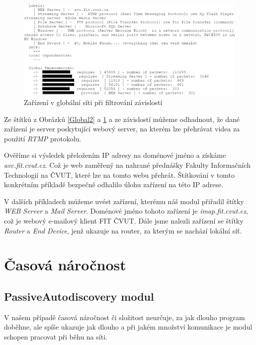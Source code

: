 \documentclass[thesis=B,czech,hidelinks]{FITthesis}[2019/03/21]
\begin{document}
    \newpage
    \begin{figure}[h!]
        \centering
        \includegraphics[width=\textwidth]{Global_filter.png}
        \caption[Ukázka měření: Globální síť s filtrováním závislostí]{Zařízení v globální síti při filtrování závislostí}
        \label{Global3}
    \end{figure}
    
    Ze štítků z Obrázků \ref{Global2} a \ref{Global3}  a ze závislostí můžeme odhadnout, že dané zařízení je server poskytující webový server, na kterém lze přehrávat videa za použití \emph{RTMP} protokolu.
    
    Ověříme si výsledek přeložením IP adresy na doménové jméno a získáme \emph{avc.fit.cvut.cz}. Což je web zaměřený na nahrané přednášky Fakulty Informačních Technologií na ČVUT, které lze na tomto webu přehrát. Štítkování v tomto konkrétním příkladě bezpečně odhalilo úlohu zařízení na této IP adrese. 
    
    V dalších příkladech můžeme uvést zařízení, kterému náš modul přiřadil štítky \emph{WEB Server} a \emph{Mail Server}. Doménové jméno tohoto zařízení je \emph{imap.fit.cvut.cz}, což je webový e-mailový klient FIT ČVUT. Dále jsme nalezli zařízení se štítky \emph{Router} a \emph{End Device}, jenž ukazuje na router, za kterým se nachází lokální síť. 
    
    
    \newpage
    \section{Časová náročnost}
    \subsection{PassiveAutodiscovery modul}
    V našem případě časová náročnost či složitost neurčuje, za jak dlouho program doběhne, ale spíše ukazuje jak dlouho a při jakém množství komunikace je modul schopen pracovat při běhu na síti.
    
\end{document}
